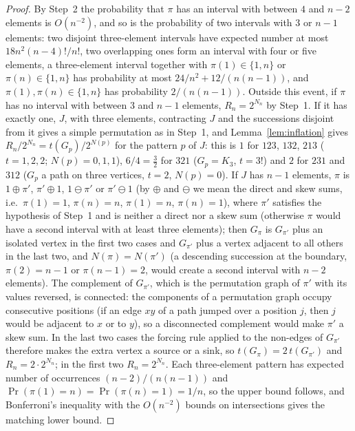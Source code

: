\begin{proof}
By Step~2 the probability that $\pi$ has an interval with between $4$ and $n-2$ elements is $O(n^{-2})$, and so is the probability of two intervals with $3$ or $n-1$ elements: two disjoint three-element intervals have expected number at most $18n^2(n-4)!/n!$, two overlapping ones form an interval with four or five elements, a three-element interval together with $\pi(1)\in\{1,n\}$ or $\pi(n)\in\{1,n\}$ has probability at most $24/n^2+12/(n(n-1))$, and $\pi(1),\pi(n)\in\{1,n\}$ has probability $2/(n(n-1))$. Outside this event, if $\pi$ has no interval with between $3$ and $n-1$ elements, $R_n=2^{N_n}$ by Step~1. If it has exactly one, $J$, with three elements, contracting $J$ and the successions disjoint from it gives a simple permutation as in Step~1, and Lemma~\ref{lem:inflation} gives $R_n/2^{N_n}=t(G_p)/2^{N(p)}$ for the pattern $p$ of $J$: this is $1$ for $123$, $132$, $213$ ($t=1,2,2$; $N(p)=0,1,1$), $6/4=\tfrac32$ for $321$ ($G_p=K_3$, $t=3!$) and $2$ for $231$ and $312$ ($G_p$ a path on three vertices, $t=2$, $N(p)=0$). If $J$ has $n-1$ elements, $\pi$ is $1\oplus\pi'$, $\pi'\oplus1$, $1\ominus\pi'$ or $\pi'\ominus1$ (by $\oplus$ and $\ominus$ we mean the direct and skew sums, i.e.\ $\pi(1)=1$, $\pi(n)=n$, $\pi(1)=n$, $\pi(n)=1$), where $\pi'$ satisfies the hypothesis of Step~1 and is neither a direct nor a skew sum (otherwise $\pi$ would have a second interval with at least three elements); then $G_\pi$ is $G_{\pi'}$ plus an isolated vertex in the first two cases and $G_{\pi'}$ plus a vertex adjacent to all others in the last two, and $N(\pi)=N(\pi')$ (a descending succession at the boundary, $\pi(2)=n-1$ or $\pi(n-1)=2$, would create a second interval with $n-2$ elements). The complement of $G_{\pi'}$, which is the permutation graph of $\pi'$ with its values reversed, is connected: the components of a permutation graph occupy consecutive positions (if an edge $xy$ of a path jumped over a position $j$, then $j$ would be adjacent to $x$ or to $y$), so a disconnected complement would make $\pi'$ a skew sum. In the last two cases the forcing rule applied to the non-edges of $G_{\pi'}$ therefore makes the extra vertex a source or a sink, so $t(G_\pi)=2\,t(G_{\pi'})$ and $R_n=2\cdot2^{N_n}$; in the first two $R_n=2^{N_n}$. Each three-element pattern has expected number of occurrences $(n-2)/(n(n-1))$ and $\Pr(\pi(1)=n)=\Pr(\pi(n)=1)=1/n$, so the upper bound follows, and Bonferroni's inequality with the $O(n^{-2})$ bounds on intersections gives the matching lower bound.
\end{proof}

